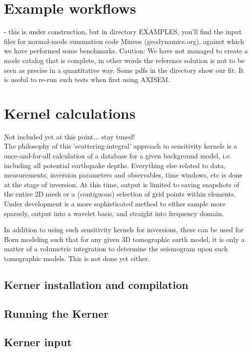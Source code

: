 \documentclass[11pt,letter,fleqn,english,notitlepage]{article}
\begin{document}
\section{Example workflows}
- this is under construction, but in directory EXAMPLES, you'll find
the input files for normal-mode summation code Mineos
(geodynamics.org), against which we have performed some
benchmarks. Caution: We have not managed to create a mode catalog that
is complete, in other words the reference solution is not to be seen
as precise in a quantitative way. Some pdfs in the directory show our
fit. It is useful to re-run such tests when first using AXISEM.

\section{Kernel calculations}
Not included yet at this point... stay tuned!\\

\noindent The philosophy of this 'scattering-integral' approach to sensitivity kernels 
is a once-and-for-all calculation of a database for a given background model,
i.e. including all potential earthquake depths. Everything else related to 
data, measurements, inversion parameters and observables, time windows, etc 
is done at the stage of inversion. At this time, output is limited to 
saving snapshots of the entire 2D mesh or a (contiguous) selection of grid points 
within elements. Under development is a more 
sophisticated method to either sample more sparsely, output into a wavelet 
basis, and straight into frequency domain. 

In addition to using such sensitivity kernels for inversions, 
these can be used for Born modeling such that for any given 3D tomographic earth model, 
it is only a matter of a volumetric integration to determine the seismogram upon such tomographic 
models. This is not done yet either.

\subsection{Kerner installation and compilation}
\subsection{Running the Kerner}
\subsection{Kerner input}
\end{document}
